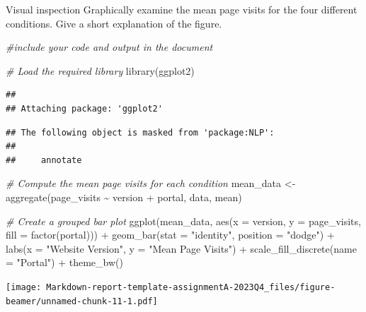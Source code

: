 \documentclass[
  ignorenonframetext,
]{beamer}
\newenvironment{Shaded}{\begin{snugshade}}{\end{snugshade}}
\newcommand{\AttributeTok}[1]{\textcolor[rgb]{0.77,0.63,0.00}{#1}}
\newcommand{\CommentTok}[1]{\textcolor[rgb]{0.56,0.35,0.01}{\textit{#1}}}
\newcommand{\FunctionTok}[1]{\textcolor[rgb]{0.00,0.00,0.00}{#1}}
\newcommand{\NormalTok}[1]{#1}
\newcommand{\OtherTok}[1]{\textcolor[rgb]{0.56,0.35,0.01}{#1}}
\newcommand{\SpecialCharTok}[1]{\textcolor[rgb]{0.00,0.00,0.00}{#1}}
\newcommand{\StringTok}[1]{\textcolor[rgb]{0.31,0.60,0.02}{#1}}
\begin{document}
\begin{frame}[fragile]{Visual inspection}
\protect\hypertarget{visual-inspection}{}
Graphically examine the mean page visits for the four different
conditions. Give a short explanation of the figure.

\begin{Shaded}
\begin{Highlighting}[]
\CommentTok{\#include your code and output in the document}

\CommentTok{\# Load the required library}
\FunctionTok{library}\NormalTok{(ggplot2)}
\end{Highlighting}
\end{Shaded}

\begin{verbatim}
## 
## Attaching package: 'ggplot2'
\end{verbatim}

\begin{verbatim}
## The following object is masked from 'package:NLP':
## 
##     annotate
\end{verbatim}

\begin{Shaded}
\begin{Highlighting}[]
\CommentTok{\# Compute the mean page visits for each condition}
\NormalTok{mean\_data }\OtherTok{\textless{}{-}} \FunctionTok{aggregate}\NormalTok{(page\_visits }\SpecialCharTok{\textasciitilde{}}\NormalTok{ version }\SpecialCharTok{+}\NormalTok{ portal, data, mean)}

\CommentTok{\# Create a grouped bar plot}
\FunctionTok{ggplot}\NormalTok{(mean\_data, }\FunctionTok{aes}\NormalTok{(}\AttributeTok{x =}\NormalTok{ version, }\AttributeTok{y =}\NormalTok{ page\_visits, }\AttributeTok{fill =} \FunctionTok{factor}\NormalTok{(portal))) }\SpecialCharTok{+}
  \FunctionTok{geom\_bar}\NormalTok{(}\AttributeTok{stat =} \StringTok{"identity"}\NormalTok{, }\AttributeTok{position =} \StringTok{"dodge"}\NormalTok{) }\SpecialCharTok{+}
  \FunctionTok{labs}\NormalTok{(}\AttributeTok{x =} \StringTok{"Website Version"}\NormalTok{, }\AttributeTok{y =} \StringTok{"Mean Page Visits"}\NormalTok{) }\SpecialCharTok{+}
  \FunctionTok{scale\_fill\_discrete}\NormalTok{(}\AttributeTok{name =} \StringTok{"Portal"}\NormalTok{) }\SpecialCharTok{+}
  \FunctionTok{theme\_bw}\NormalTok{()}
\end{Highlighting}
\end{Shaded}

\texttt{[image: Markdown-report-template-assignmentA-2023Q4\_files/figure-beamer/unnamed-chunk-11-1.pdf]}


\end{frame}
\end{document}
